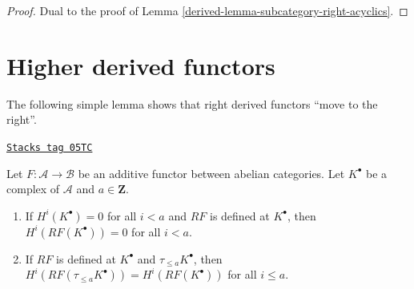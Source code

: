 \begin{proof}

Dual to the proof of
Lemma \ref{derived-lemma-subcategory-right-acyclics}.
\end{proof}

\section{Higher derived functors}
\label{derived-section-higher-derived}
The following simple lemma shows that right derived functors
``move to the right''.

\begin{lemma}
\label{derived-lemma-negative-vanishing}
\href{https://stacks.math.columbia.edu/tag/05TC}{\texttt{Stacks tag 05TC}}

Let $F : \mathcal{A} \to \mathcal{B}$ be an additive functor
between abelian categories. Let $K^\bullet$ be a complex of $\mathcal{A}$
and $a \in \mathbf{Z}$.
\begin{enumerate}
\item If $H^i(K^\bullet) = 0$ for all $i < a$ and $RF$ is defined at
$K^\bullet$, then $H^i(RF(K^\bullet)) = 0$ for all $i < a$.
\item If $RF$ is defined at $K^\bullet$ and $\tau_{\leq a}K^\bullet$,
then $H^i(RF(\tau_{\leq a}K^\bullet)) = H^i(RF(K^\bullet))$
for all $i \leq a$.
\end{enumerate}
\end{lemma}

